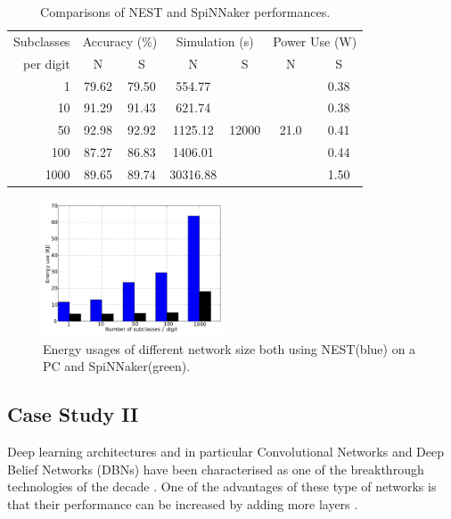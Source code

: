 \begin{table}[h]
\caption{Comparisons of NEST and SpiNNaker performances.}
\begin{center}
\begin{tabular} {r|c|c|c|c|c|c}
	 Subclasses
	 &\multicolumn{2}{c|}{Accuracy (\%)}  &\multicolumn{2}{c|}{Simulation (s)}
	 &\multicolumn{2}{c}{Power Use (W)}   \\
	 \cline{2-7}
	 per digit
	& N & S & N & S & N & S\\
    \hline
    1 & 79.62 & 79.50 & 554.77 & \multirow{5}{*}{12000} & \multirow{5}{*}{ 21.0 } & 0.38 \\
    10 & 91.29 & 91.43 & 621.74 &   &   & 0.38 \\
    50 & 92.98 & 92.92 & 1125.12 &   &   & 0.41 \\
    100 & 87.27 & 86.83 & 1406.01 &   &   & 0.44 \\
    1000 & 89.65 & 89.74 & 30316.88 &   &   & 1.50 \\

\end{tabular}
\label{tbl:compare}
\end{center}
\end{table}

\begin{figure}[hbt!]
	\centering
	\includegraphics[width=0.48\textwidth]{images/energy.pdf}
	\caption{Energy usages of different network size both using NEST(blue) on a PC and SpiNNaker(green).}
	\label{fig:energy}
\end{figure}
\subsection{Case Study II}
Deep learning architectures and in particular Convolutional Networks \citep{lecun1998gradient} and Deep Belief Networks (DBNs) \citep{Hinton_etal_2006} have been characterised as one of the breakthrough technologies of the decade \citep{MIT_TechReview}. One of the advantages of these type of networks is that their performance can be increased by adding more layers \citep{Hinton_Contr_Divergence2006}.

